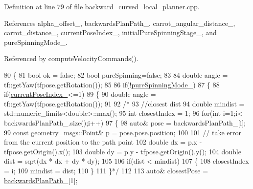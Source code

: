 Definition at line 79 of file backward\+\_\+curved\+\_\+local\+\_\+planner.\+cpp.



References alpha\+\_\+offset\+\_\+, backwards\+Plan\+Path\+\_\+, carrot\+\_\+angular\+\_\+distance\+\_\+, carrot\+\_\+distance\+\_\+, current\+Pose\+Index\+\_\+, initial\+Pure\+Spinning\+Stage\+\_\+, and pure\+Spinning\+Mode\+\_\+.



Referenced by compute\+Velocity\+Commands().


\begin{DoxyCode}
80 \{
81     \textcolor{keywordtype}{bool} ok = \textcolor{keyword}{false};
82     \textcolor{keywordtype}{bool} pureSpinning=\textcolor{keyword}{false};
83 
84     \textcolor{keywordtype}{double} angle = tf::getYaw(tfpose.getRotation());
85 
86     \textcolor{keywordflow}{if}(!\hyperlink{classbackward__local__planner_1_1BackwardLocalPlanner_a04a769cc9f1ae5170b06c92edfbb80f6}{pureSpinningMode\_})
87     \{
88         \textcolor{keywordflow}{if}(\hyperlink{classbackward__local__planner_1_1BackwardLocalPlanner_af2485562720c0ce3c895debdbdfc89f3}{currentPoseIndex\_}<=1)
89         \{
90             \textcolor{keywordtype}{double} angle = tf::getYaw(tfpose.getRotation());
91 
92             \textcolor{comment}{/*}
93 \textcolor{comment}{            //closest dist}
94 \textcolor{comment}{            double mindist = std::numeric\_limits<double>::max();}
95 \textcolor{comment}{            int closestIndex = 1;}
96 \textcolor{comment}{            for(int i=1;i< backwardsPlanPath\_.size();i++)}
97 \textcolor{comment}{            \{}
98 \textcolor{comment}{                auto& pose = backwardsPlanPath\_[i];}
99 \textcolor{comment}{                const geometry\_msgs::Point& p = pose.pose.position;}
100 \textcolor{comment}{}
101 \textcolor{comment}{                // take error from the current position to the path point}
102 \textcolor{comment}{                double dx = p.x - tfpose.getOrigin().x();}
103 \textcolor{comment}{                double dy = p.y - tfpose.getOrigin().y();}
104 \textcolor{comment}{                double dist = sqrt(dx * dx + dy * dy);}
105 \textcolor{comment}{}
106 \textcolor{comment}{                if(dist < mindist)}
107 \textcolor{comment}{                \{}
108 \textcolor{comment}{                    closestIndex = i;}
109 \textcolor{comment}{                    mindist = dist;}
110 \textcolor{comment}{                \}}
111 \textcolor{comment}{            \}*/}
112             
113             \textcolor{keyword}{auto}& closestPose = \hyperlink{classbackward__local__planner_1_1BackwardLocalPlanner_aaa37c16e1735cb440986b3d41e6ef8e6}{backwardsPlanPath\_}[1];

\end{DoxyCode}
